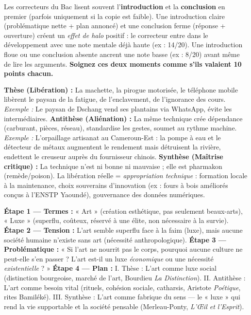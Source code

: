 \documentclass[11pt]{article}
\newcommand{\cle}[1]{{\popxbold\color{popdark}#1}}
\begin{document}
\begin{savaistu}
Les correcteurs du Bac lisent souvent l'\textbf{introduction} et la \textbf{conclusion} en premier (parfois uniquement si la copie est faible). Une introduction claire (problématique nette + plan annoncé) et une conclusion ferme (réponse + ouverture) créent un \emph{effet de halo} positif : le correcteur entre dans le développement avec une note mentale déjà haute (ex : 14/20). Une introduction floue ou une conclusion absente ancrent une note basse (ex : 8/20) avant même de lire les arguments. \textbf{Soignez ces deux moments comme s'ils valaient 10 points chacun.}
\end{savaistu}

\begin{exemplebox}
\textbf{Thèse (Libération) :} La machette, la pirogue motorisée, le téléphone mobile libèrent le paysan de la fatigue, de l'enclavement, de l'ignorance des cours. \emph{Exemple :} Le paysan de Dschang vend ses plantains via WhatsApp, évite les intermédiaires.
\textbf{Antithèse (Aliénation) :} La même technique crée dépendance (carburant, pièces, réseau), standardise les gestes, soumet au rythme machine. \emph{Exemple :} L'orpaillage artisanat au Cameroun-Est : la pompe à eau et le détecteur de métaux augmentent le rendement mais détruisent la rivière, endettent le creuseur auprès du fournisseur chinois.
\textbf{Synthèse (Maîtrise critique) :} La technique n'est ni bonne ni mauvaise ; elle est \cle{pharmakon} (remède/poison). La libération réelle = \emph{appropriation technique} : formation locale à la maintenance, choix souverains d'innovation (ex : fours à bois améliorés conçus à l'ENSTP Yaoundé), gouvernance des données numériques.
\end{exemplebox}

\begin{exoresolu}
\textbf{Étape 1 — Termes :} « Art » (création esthétique, pas seulement beaux-arts), « Luxe » (superflu, coûteux, réservé à une élite, non nécessaire à la survie).
\textbf{Étape 2 — Tension :} L'art semble superflu face à la faim (luxe), mais aucune société humaine n'existe sans art (nécessité anthropologique).
\textbf{Étape 3 — Problématique :} « Si l'art ne nourrit pas le corps, pourquoi aucune culture ne peut-elle s'en passer ? L'art est-il un luxe \emph{économique} ou une nécessité \emph{existentielle} ? »
\textbf{Étape 4 — Plan :}
I. Thèse : L'art comme luxe social (distinction bourgeoise, marché de l'art, Bourdieu \emph{La Distinction}).
II. Antithèse : L'art comme besoin vital (rituels, cohésion sociale, catharsis, Aristote \emph{Poétique}, rites Bamiléké).
III. Synthèse : L'art comme \cle{fabrique du sens} — le « luxe » qui rend la vie supportable et la société pensable (Merleau-Ponty, \emph{L'Œil et l'Esprit}).
\end{exoresolu}
\end{document}
